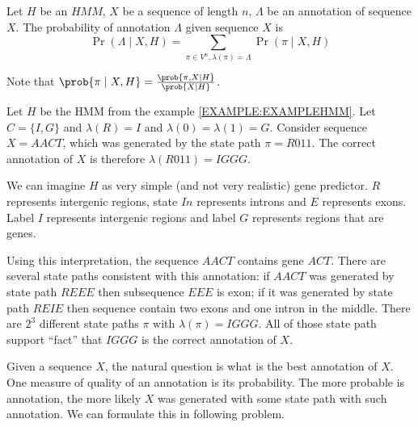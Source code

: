 
\begin{definition}
Let $H$ be an $HMM$, $X$ be a sequence of length $n$, $\Lambda$ be an annotation of sequence
$X$. The probability of annotation $\Lambda$ given sequence $X$ is 
\begin{equation}
\Pr\left(\Lambda\mid X,H\right)=\sum_{\pi \in V^n,\lambda(\pi) =
\Lambda}\Pr\left(\pi\mid X,H \right)\label{DEF:ANNOTATION:PROBABILITY}
\end{equation}
\end{definition}

Note that $\prob{\pi\mid X,H}=\frac{\prob{\pi,X\mid H}}{\prob{X\mid
H}}$.

\begin{example}\label{EXAMPLE:ANNOTATION}
Let $H$ be the HMM from the example \ref{EXAMPLE:EXAMPLEHMM}. Let $C=\{I,G\}$ and
$\lambda(R)=I$ and $\lambda(0)=\lambda(1)=G$.  Consider sequence
$X=AACT$, which was generated by the state path $\pi=R011$. The correct
annotation of $X$ is therefore  $\lambda(R011) =
IGGG$. 

 We can imagine $H$ as very simple (and not very realistic) gene
predictor. $R$ represents intergenic regions, state $In$
represents introns and $E$ represents exons. Label $I$ represents
intergenic regions and label $G$ represents regions that are genes.

Using this interpretation, the sequence $AACT$ contains gene $ACT$. There are
several state paths consistent with this annotation: if $AACT$ was generated by state path
$REEE$ then subsequence $EEE$ is exon; if it was generated by state path $REIE$
then sequence contain two exons and one intron in the middle. There are $2^3$
different state paths $\pi$ with $\lambda(\pi)=IGGG$.  All of those state path
support ``fact'' that $IGGG$ is the correct annotation of $X$.

\end{example}



Given a sequence $X$, the natural question is what is the best annotation of
$X$.  One measure of quality of an annotation is its probability. The more
probable is annotation, the more likely $X$ was generated with some state path with
such annotation. We can formulate this in following problem.


